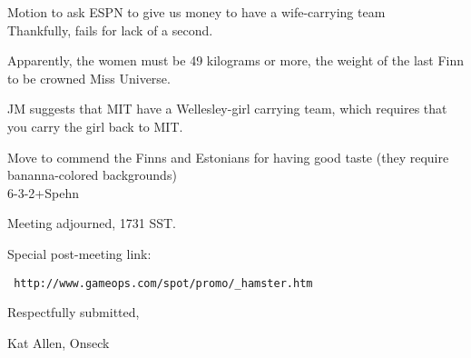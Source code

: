 \documentclass[12pt]{article}
\begin{document}
Motion to ask ESPN to give us money to have a wife-carrying team\\
Thankfully, fails for lack of a second.

Apparently, the women must be 49 kilograms or more, the weight of the
last Finn to be crowned Miss Universe.

JM suggests that MIT have a Wellesley-girl carrying team, which
requires that you carry the girl back to MIT.

Move to commend the Finns and Estonians for having good taste (they
require bananna-colored backgrounds)\\
6-3-2+Spehn 

\vspace{12pt}

\noindent
Meeting adjourned, 1731 SST.

Special post-meeting link: \begin{verbatim} http://www.gameops.com/spot/promo/_hamster.htm\end{verbatim}

\vspace{18pt}

\centerline{Respectfully submitted,}
\centerline{Kat Allen,  Onseck}
\end{document}
